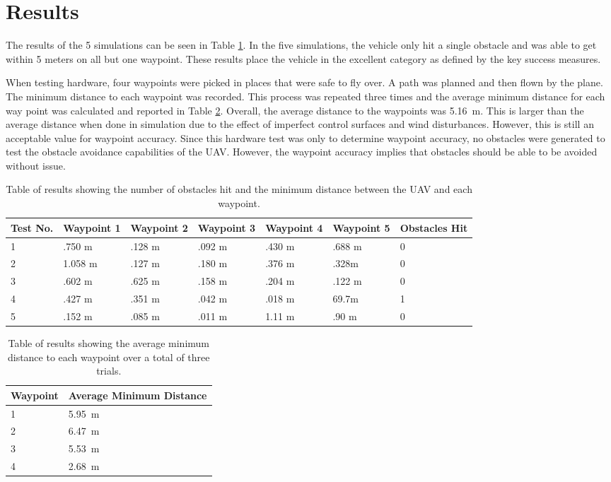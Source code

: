 \documentclass[]{auvsi_doc}
\begin{document}
\section*{Results}

The results of the 5 simulations can be seen in Table \ref{tab:results}. In the five simulations, the vehicle only hit a single obstacle and was able to get within 5 meters on all but one waypoint.
These results place the vehicle in the excellent category as defined by the key success measures.

When testing hardware, four waypoints were picked in places that were safe to fly over. A path was planned and then flown by the plane. The minimum distance to each waypoint was recorded. This process was repeated three times and the average minimum distance for each way point was calculated and reported in Table \ref{tab:hardware}. Overall, the average distance to the waypoints was 5.16~m. This is larger than the average distance when done in simulation due to the effect of imperfect control surfaces and wind disturbances. However, this is still an acceptable value for waypoint accuracy. Since this hardware test was only to determine waypoint accuracy, no obstacles were generated to test the obstacle avoidance capabilities of the UAV. However, the waypoint accuracy implies that obstacles should be able to be avoided without issue.

\begin{table}[h!]

\caption{Table of results showing the number of obstacles hit and the minimum distance between the UAV and each waypoint.}
\label{tab:results}
\begin{tabular} {|l|l|l|l|l|l|l|}
\hline
Test No. & Waypoint 1&Waypoint 2&Waypoint 3&Waypoint 4&Waypoint 5& Obstacles Hit\\
\hline
1 & .750 m& .128 m& .092 m& .430 m& .688 m & 0\\
2 & 1.058 m &.127 m & .180 m & .376 m & .328m & 0\\
3& .602 m& .625 m&.158 m& .204 m& .122 m& 0\\
4& .427 m & .351 m & .042 m & .018 m& 69.7m& 1\\
5& .152 m& .085 m& .011 m & 1.11 m & .90 m& 0\\
\hline
\end{tabular}
\end{table}

\begin{table}[h!]

\caption{Table of results showing the average minimum distance to each waypoint over a total of three trials.}
\label{tab:hardware}
\begin{tabular} {|l|l|}
\hline
Waypoint & Average Minimum Distance\\
\hline
1 & 5.95~m\\
2 & 6.47~m\\
3& 5.53~m\\
4& 2.68~m\\
\hline
\end{tabular}
\end{table}
\end{document}
